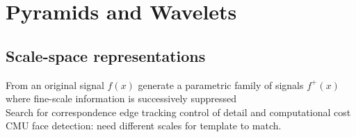 \section{Pyramids and Wavelets}
\subsection*{Scale-space representations}
From an original signal $f(x)$ generate a parametric family of signals $f^+(x)$ where fine-scale information is successively suppressed  \\
 Search for correspondence  edge tracking  control of detail and computational cost \\
 CMU face detection: need different scales for template to match.